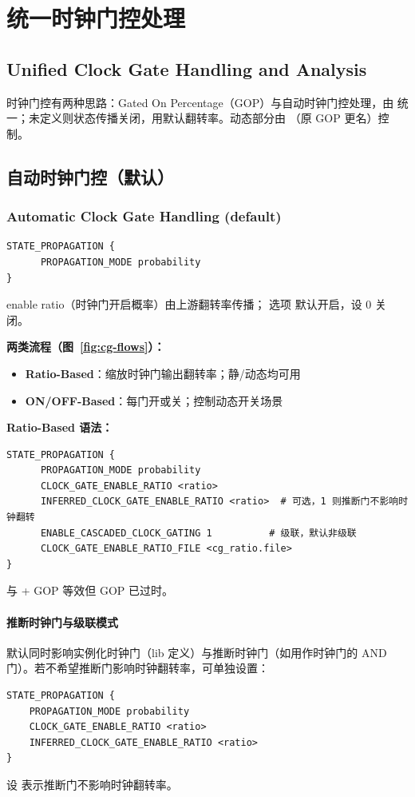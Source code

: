 \section{统一时钟门控处理}
\subsection*{Unified Clock Gate Handling and Analysis}

时钟门控有两种思路：Gated On Percentage（GOP）与自动时钟门控处理，由  统一；未定义则状态传播关闭，用默认翻转率。动态部分由 （原 GOP 更名）控制。

\subsection{自动时钟门控（默认）}
\subsubsection*{Automatic Clock Gate Handling (default)}

\begin{lstlisting}
STATE_PROPAGATION {
      PROPAGATION_MODE probability
}
\end{lstlisting}

enable ratio（时钟门开启概率）由上游翻转率传播； 选项  默认开启，设 0 关闭。

\textbf{两类流程（图~\ref{fig:cg-flows}）：}
\begin{itemize}
  \item \textbf{Ratio-Based}：缩放时钟门输出翻转率；静/动态均可用
  \item \textbf{ON/OFF-Based}：每门开或关；控制动态开关场景
\end{itemize}

\label{fig:cg-flows}

\textbf{Ratio-Based 语法：}
\begin{lstlisting}
STATE_PROPAGATION {
      PROPAGATION_MODE probability
      CLOCK_GATE_ENABLE_RATIO <ratio>
      INFERRED_CLOCK_GATE_ENABLE_RATIO <ratio>  # 可选，1 则推断门不影响时钟翻转
      ENABLE_CASCADED_CLOCK_GATING 1          # 级联，默认非级联
      CLOCK_GATE_ENABLE_RATIO_FILE <cg_ratio.file>
}
\end{lstlisting}

与  + GOP 等效但 GOP 已过时。
\paragraph{推断时钟门与级联模式}
 默认同时影响实例化时钟门（lib 定义）与推断时钟门（如用作时钟门的 AND 门）。若不希望推断门影响时钟翻转率，可单独设置：
\begin{lstlisting}
STATE_PROPAGATION {
    PROPAGATION_MODE probability
    CLOCK_GATE_ENABLE_RATIO <ratio>
    INFERRED_CLOCK_GATE_ENABLE_RATIO <ratio>
}
\end{lstlisting}
设  表示推断门不影响时钟翻转率。

